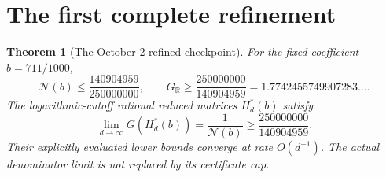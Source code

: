 \documentclass[11pt]{article}
\newtheorem{theorem}{Theorem}
\begin{document}
\section{The first complete refinement}
\label{sec:new-complete-refined-certificate}
\begin{theorem}[The October 2 refined checkpoint]
\label{thm:new-complete-refined-certificate}
For the fixed coefficient $b=711/1000$,
\[
 \mathcal N(b)\leq\frac{140904959}{250000000},\qquad
 G_{\mathbb R}\geq\frac{250000000}{140904959}
             =1.7742455749907283\ldots.
\]
The logarithmic-cutoff rational reduced matrices $H_d^*(b)$ satisfy
\[
 \lim_{d\to\infty}G(H_d^*(b))=\frac1{\mathcal N(b)}
       \geq\frac{250000000}{140904959}.
\]
Their explicitly evaluated lower bounds converge at rate $O(d^{-1})$.
The actual denominator limit is not replaced by its certificate cap.
\end{theorem}
\end{document}
